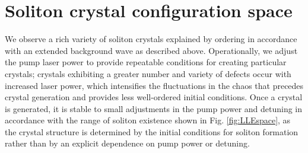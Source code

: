  
\section{Soliton crystal configuration space}\label{sec:SCtaxonomy}

We observe a rich variety of soliton crystals explained by ordering in accordance with an extended background wave as described above. Operationally, we adjust the pump laser power to provide repeatable conditions for creating particular crystals; crystals exhibiting a greater number and variety of defects occur with increased laser power, which intensifies the fluctuations in the chaos that precedes crystal generation and provides less well-ordered initial conditions. Once a crystal is generated, it is stable to small adjustments in the pump power and detuning in accordance with the range of soliton existence shown in Fig. \ref{fig:LLEspace}, as the crystal structure is determined by the initial conditions for soliton formation rather than by an explicit dependence on pump power or detuning. 

